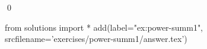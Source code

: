 
\begin{ex} 
  \label{ex:power-summ1}
  
  \qed
\end{ex} 
\begin{python0}
from solutions import *
add(label="ex:power-summ1",
    srcfilename='exercises/power-summ1/answer.tex') 
\end{python0}
